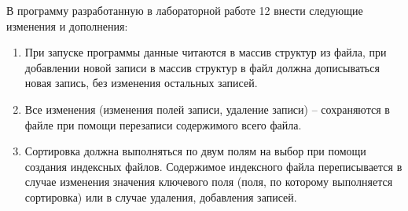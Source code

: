 В программу разработанную в лабораторной работе 12 внести следующие изменения и дополнения:

\begin{enumerate}
    \item При запуске программы данные читаются в массив структур из файла, при добавлении новой записи в массив структур в файл должна дописываться новая запись, без изменения остальных записей.
    \item Все изменения (изменения полей записи, удаление записи) – сохраняются в файле при помощи перезаписи содержимого всего файла.
    \item Сортировка должна выполняться по двум полям на выбор при помощи создания индексных файлов. Содержимое индексного файла переписывается в случае изменения значения ключевого поля (поля, по которому выполняется сортировка) или в случае удаления, добавления записей.
\end{enumerate}
